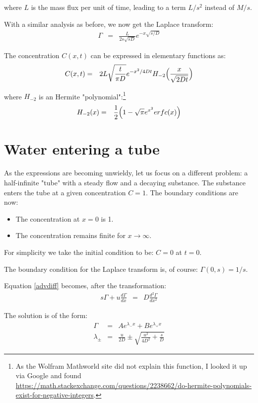\documentclass[onecolumn]{article}
\begin{document}
\noindent where $L$ is the mass flux per unit of time, leading to a term $L/s^2$ instead of $M/s$.

With a similar analysis as before, we now get the Laplace transform:
\begin{eqnarray}
   \Gamma &=& \frac{L} {2 s \sqrt{sD} } e^{-x \sqrt{s/D}}
\end{eqnarray}

The concentration $C(x,t)$ can be expressed in elementary functions as:
\begin{eqnarray}
   C(x,t) &=& 2L \sqrt{\frac{t}{\pi D}} e^{-x^2/4Dt} H_{-2}\Bigl(\frac{x}{\sqrt{2Dt}}\Bigr)
\end{eqnarray}

\noindent where $H_{-2}$ is an Hermite "polynomial":\footnote{As the Wolfram Mathworld site did not explain this function, I looked
it up via Google and found \url{https://math.stackexchange.com/questions/2238662/do-hermite-polynomials-exist-for-negative-integers}.}
\begin{eqnarray}
     H_{-2}(x) &=& \frac{1}{2} \Bigl(1 - \sqrt{\pi} e^{x^2} erfc(x) \Bigr)
\end{eqnarray}

\section*{Water entering a tube}
As the expressions are becoming unwieldy, let us focus on a different problem: a half-infinite "tube" with a steady flow
and a decaying substance. The substance enters the tube at a given concentration $C = 1$. The boundary conditions
are now:
\begin{itemize}
\item
The concentration at $x = 0$ is 1.
\item
The concentration remains finite for $x \rightarrow \infty$.
\end{itemize}
For simplicity we take the initial condition to be: $C = 0$ at $t = 0$.

The boundary condition for the Laplace transform is, of course: $\Gamma(0,s) = 1/s$.

Equation \ref{advdiff} becomes, after the transformation:
\begin{eqnarray}
     s \Gamma + u \frac{d \Gamma}{dx} &=& D \frac{d^2 \Gamma}{dx^2}
\end{eqnarray}

The solution is of the form:
\begin{eqnarray}
\nonumber    \Gamma        &=& A e^{\lambda_- x} + B e^{\lambda_+ x} \\
\nonumber    \lambda_{\pm} &=& \frac{u}{2D} \pm \sqrt{\frac{u^2}{4D^2} + \frac{s}{D}}
\end{eqnarray}
\end{document}
